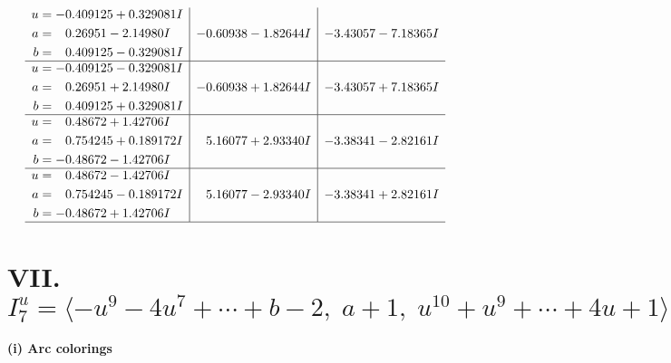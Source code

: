 \documentclass[1p]{elsarticle_modified}
\theoremstyle{definition}
\begin{document}
$$\begin{array}{c|c|c}
\begin{aligned}
u &= -0.409125 + 0.329081 I \\
a &= \phantom{-}0.26951 - 2.14980 I \\
b &= \phantom{-}0.409125 - 0.329081 I\end{aligned}
 & -0.60938 - 1.82644 I & -3.43057 - 7.18365 I \\ \hline\begin{aligned}
u &= -0.409125 - 0.329081 I \\
a &= \phantom{-}0.26951 + 2.14980 I \\
b &= \phantom{-}0.409125 + 0.329081 I\end{aligned}
 & -0.60938 + 1.82644 I & -3.43057 + 7.18365 I \\ \hline\begin{aligned}
u &= \phantom{-}0.48672 + 1.42706 I \\
a &= \phantom{-}0.754245 + 0.189172 I \\
b &= -0.48672 - 1.42706 I\end{aligned}
 & \phantom{-}5.16077 + 2.93340 I & -3.38341 - 2.82161 I \\ \hline\begin{aligned}
u &= \phantom{-}0.48672 - 1.42706 I \\
a &= \phantom{-}0.754245 - 0.189172 I \\
b &= -0.48672 + 1.42706 I\end{aligned}
 & \phantom{-}5.16077 - 2.93340 I & -3.38341 + 2.82161 I\\
 \hline 
 \end{array}$$\newpage\newpage\renewcommand{\arraystretch}{1}
\centering \section*{VII. $I^u_{7}= \langle - u^9-4 u^7+\cdots+b-2,\;a+1,\;u^{10}+u^9+\cdots+4 u+1 \rangle$}
\flushleft \textbf{(i) Arc colorings}\\
\end{document}
